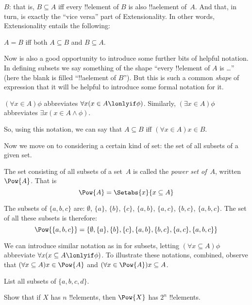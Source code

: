 \documentclass[../../../include/open-logic-section]{subfiles}
\begin{document}
	$B$: that is, $B \subseteq A$ iff every !!{element} of $B$ is also !!a{element}
	of~$A$. And that, in turn, is exactly the ``vice versa'' part of
	Extensionality. In other words, Extensionality entails the following:
\begin{prop}
	$A = B$ iff both $A \subseteq B$ and $B \subseteq A$.
\end{prop}\noindent
Now is also a good opportunity to introduce some further bits of helpful notation. In defining subsets we say something of the shape ``every !!{element} of $A$ is \ldots'' (here the blank is filled ``!!a{element} of $B$''). But this is such a common \emph{shape} of expression that it will be helpful to introduce some formal notation for it.
\begin{defn}
	$(\forall x \in A)\phi$ abbreviates $\forall x(x \in A \lonlyif \phi)$. Similarly, $(\exists x \in A)\phi$ abbreviates $\exists x(x \in A \land \phi)$. 
\end{defn}\noindent
So, using this notation, we can say that $A \subseteq B$ iff $(\forall x \in A)x \in B$. 

Now we move on to considering a certain kind of set: the set of all subsets of a given set. 
\begin{defn}
	The set consisting of all subsets of a set~$A$ is called the
	\emph{power set of}~$A$, written $\Pow{A}$. That is
	\[\Pow{A} =  \Setabs{x}{x \subseteq A}\]
\end{defn}
\begin{ex}
	The subsets of $\{ a, b, c \}$ are:
	$\emptyset$, $\{a \}$, $\{b\}$, $\{c\}$, $\{a, b\}$, $\{a, c\}$, $\{b,
	c\}$, $\{a, b, c\}$. The set of all these subsets is therefore:
	\[
	\Pow{\{ a, b, c \}} = \{\emptyset, \{a \}, \{b\}, \{c\}, \{a, b\},
	\{b, c\}, \{a, c\}, \{a, b, c\}\}
	\]
\end{ex}\noindent
We can introduce similar notation as in  for subsets, letting $(\forall x \subseteq A)\phi$ abbreviate $\forall x(x \subseteq A \lonlyif \phi)$. To illustrate these notations, combined, observe that $(\forall x \subseteq A)x \in \Pow{A}$ and $(\forall x \in \Pow{A})x\subseteq A$. 
\begin{prob}
	List all subsets of $\{a, b, c, d\}$.
\end{prob}

\begin{prob}
	Show that if $X$ has $n$ !!{element}s, then $\Pow{X}$ has $2^n$
	!!{element}s.
\end{prob}
\end{document}

